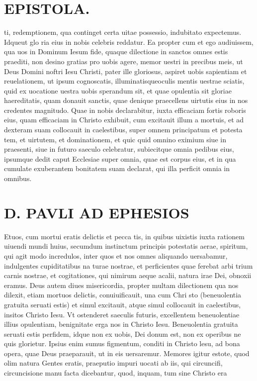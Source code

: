 \documentclass{article}
\begin{document}
\begin{pages}
\section*{EPISTOLA. }
\marginpar{[ p.90 ]}
\marginpar{[ p.91 ]}
\marginpar{[ p.92 ]}\pstart ti, redemptionem, qua continget certa uitae possessio, indubitato expectemus. Idqueut glo ria eius in nobis celebris reddatur.  \pend\pstart Ea propter cum et ego audiuissem, qua uos in Dominum Iesum fide, quaque dilectione in sanctos omnes estis praediti, non desino gratias pro uobis agere, memor uestri in precibus meis, ut Deus Domini noftri Iesu Christi, pater ille gloriosus, aspiret uobis sapientiam et reuelationem, ut ipsum cognoscatis, illuminatisqueoculis mentis uestrae sciatis, quid ex uocatione uestra uobis sperandum sit, et quae opulentia sit gloriae haereditatis, quam donauit sanctis, quae denique praecellens uirtutis eius in nos credentes magnitudo.  \pend\pstart Quae in nobis declarabitur, iuxta efficaciam fortis roboris eius, quam efficaciam in Christo exhibuit, cum excitauit illum a mortuis, et ad dexteram suam collocauit in caelestibus, super omnem principatum et potesta tem, et uirtutem, et dominationem, et quic quid omnino eximium siue in praesenti, siue in futuro saeculo celebratur, subiecitque omnia pedibus eius, ipsumque dedit caput Ecclesiae super omnia, quae est corpus eius, et in qua cumulate exuberantem bonitatem suam declarat, qui illa perficit omnia in omnibus.  \pend
\section*{D. PAVLI AD EPHESIOS }
\marginpar{[ p.1. ]}
\marginpar{[ p.2. ]}
\marginpar{[ p.3. ]}
\marginpar{[ p.4. ]}\pstart Etuos, cum mortui eratis delictis et pecca tis, in quibus uixistis iuxta rationem uiuendi mundi huius, secumdum instinctum principis potestatis aerae, spiritum, qui agit modo incredulos, inter quos et nos omnes aliquando uersabamur, indulgentes cupiditatibus na turae nostrae, et perficientes quae ferebat arbi trium carnis nostrae, et cogitationes, qui nimirum aeque acalii, natura irae Dei, obnoxii eramus.  \pend\pstart Deus autem diues misericordia, propter multam dilectionem qua nos dilexit, etiam mortuos delictis, conuiuificauit, una cum Chri sto (beneuolentia gratuita seruati estis) et simul excitauit, atque simul collocauit in caelestibus, insitos Christo Iesu. Vt ostenderet saeculis futuris, excellentem beneuolentiae illius opulentiam, benignitate erga nos in Christo Iesu.  \pend\pstart Beneuolentia gratuita seruati estis perfidem, idque non ex uobis, Dei donum est, non ex operibus ne quis glorietur. Ipsius enim sumus figmentum, conditi in Christo lesu, ad bona opera, quae Deus praeparauit, ut in eis uersaremur.  \pend\pstart Memores igitur estote, quod olim natura Gentes eratis, praeputio impuri uocati ab iis, qui circuncifi, circuncisione manu facta dicebantur, quod, inquam, tum sine Christo era\pend

\end{pages}
\end{document}
